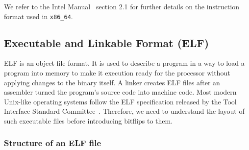 We refer to the Intel Manual~\cite{intelsys} section 2.1 for further details on
the instruction format used in \texttt{x86\_64}.

\subsection{Executable and Linkable Format (ELF)}

ELF is an object file format. It is used to describe a program in a way to load
a program into memory to make it execution ready for the processor without
applying changes to the binary itself. A linker creates ELF files after an
assembler turned the program's source code into machine code. Most modern
Unix-like operating systems follow the ELF specification released by the Tool
Interface Standard Committee~\cite{elfspec}. Therefore, we need to understand
the layout of such executable files before introducing bitflips to them.

\subsubsection{Structure of an ELF file}

